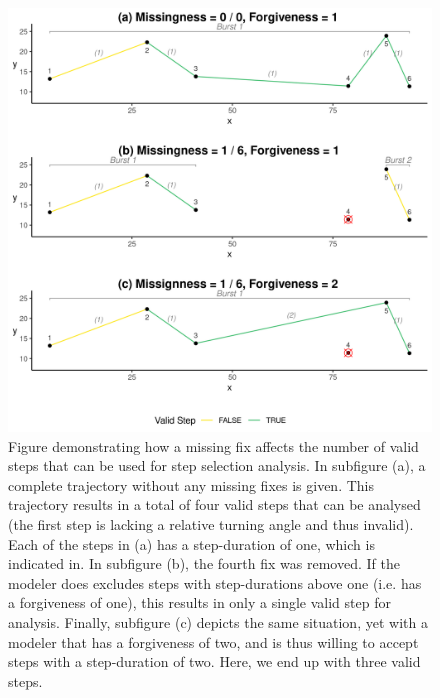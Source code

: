\documentclass[abstract=on,10pt,a4paper,bibliography=totocnumbered]{article}
\begin{document}
\begin{figure}
  \begin{center}
  \includegraphics[width = \textwidth]{99_Overview.png}
  \caption{Figure demonstrating how a missing fix affects the number of valid
  steps that can be used for step selection analysis. In subfigure (a), a
  complete trajectory without any missing fixes is given. This trajectory
  results in a total of four valid steps that can be analysed (the first step is
  lacking a relative turning angle and thus invalid). Each of the steps in (a)
  has a step-duration of one, which is indicated in. In subfigure (b), the
  fourth fix was removed. If the modeler does excludes steps with step-durations
  above one (i.e. has a forgiveness of one), this results in only a single valid
  step for analysis. Finally, subfigure (c) depicts the same situation, yet with
  a modeler that has a forgiveness of two, and is thus willing to accept steps
  with a step-duration of two. Here, we end up with three valid steps.}
  \label{Overview}
  \end{center}
\end{figure}
\end{document}
